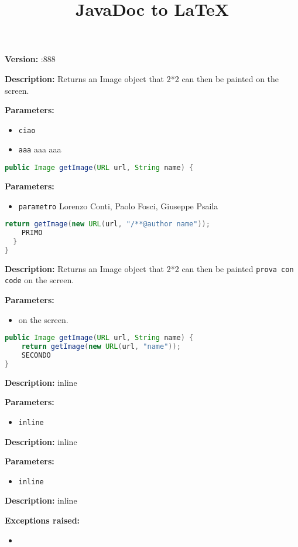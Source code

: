 \documentclass{article}
\title{JavaDoc to LaTeX}
\begin{document}
\textbf{Version:} :888

\textbf{Description:}
Returns an Image object that 2*2 can then be painted on the screen.

\textbf{Parameters:}
\begin{itemize}
  \item\texttt{ciao} 
  \item\texttt{aaa} aaa aaa
\end{itemize}

\begin{lstlisting}[language=Java]
public Image getImage(URL url, String name) {
\end{lstlisting}
\textbf{Parameters:}
\begin{itemize}
  \item\texttt{parametro} Lorenzo Conti, Paolo Fosci, Giuseppe Psaila
\end{itemize}

\begin{lstlisting}[language=Java]
    return getImage(new URL(url, "/**@author name"));
    PRIMO
  }
}
\end{lstlisting}
\textbf{Description:}
Returns an Image object that 2*2 can then be painted \texttt{prova con code} on the screen.

\textbf{Parameters:}
\begin{itemize}
  \item\texttt{} on the screen.
\end{itemize}

\begin{lstlisting}[language=Java]
public Image getImage(URL url, String name) {
    return getImage(new URL(url, "name"));
    SECONDO
}
\end{lstlisting}
\textbf{Description:}
inline

\textbf{Parameters:}
\begin{itemize}
  \item\texttt{inline} 
\end{itemize}

\textbf{Description:}
inline

\textbf{Parameters:}
\begin{itemize}
  \item\texttt{inline} 
\end{itemize}

\textbf{Description:}
inline

\textbf{Exceptions raised:}
\begin{itemize}
  \item\texttt{} 
\end{itemize}
\end{document}
